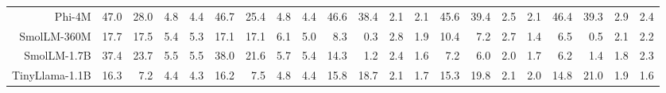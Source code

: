 \documentclass[letterpaper]{article}
\begin{document}
\begin{table}[t]
{\begin{tabular}{rrrrr|rrrr|rrrr|rrrr|rrrr}
Phi-4M & \cellcolor[HTML]{E4EDCC}47.0 & \cellcolor[HTML]{FEEDCC}28.0 & \cellcolor[HTML]{F8CECC}4.8 & \cellcolor[HTML]{F8CECC}4.4 & \cellcolor[HTML]{E3ECCC}46.7 & \cellcolor[HTML]{FEEBCC}25.4 & \cellcolor[HTML]{F9CFCC}4.8 & \cellcolor[HTML]{F8CFCC}4.4 & \cellcolor[HTML]{D3E9CC}46.6 & \cellcolor[HTML]{E4EDCC}38.4 & \cellcolor[HTML]{F9CFCC}2.1 & \cellcolor[HTML]{F8CFCC}2.1 & \cellcolor[HTML]{D4E9CC}45.6 & \cellcolor[HTML]{E1ECCC}39.4 & \cellcolor[HTML]{F8CECC}2.5 & \cellcolor[HTML]{F8CECC}2.1 & \cellcolor[HTML]{D3E9CC}46.4 & \cellcolor[HTML]{E2ECCC}39.3 & \cellcolor[HTML]{F9D0CC}2.9 & \cellcolor[HTML]{F9CFCC}2.4 \\
SmolLM-360M & \cellcolor[HTML]{FCDFCC}17.7 & \cellcolor[HTML]{FCDFCC}17.5 & \cellcolor[HTML]{F9CFCC}5.4 & \cellcolor[HTML]{F9CFCC}5.3 & \cellcolor[HTML]{FCE0CC}17.1 & \cellcolor[HTML]{FCE0CC}17.1 & \cellcolor[HTML]{F9D1CC}6.1 & \cellcolor[HTML]{F9CFCC}5.0 & \cellcolor[HTML]{FAD8CC}8.3 & \cellcolor[HTML]{F8CCCC}0.3 & \cellcolor[HTML]{F9D0CC}2.8 & \cellcolor[HTML]{F8CECC}1.9 & \cellcolor[HTML]{FBDBCC}10.4 & \cellcolor[HTML]{FAD6CC}7.2 & \cellcolor[HTML]{F8CFCC}2.7 & \cellcolor[HTML]{F8CDCC}1.4 & \cellcolor[HTML]{FAD5CC}6.5 & \cellcolor[HTML]{F8CCCC}0.5 & \cellcolor[HTML]{F8CECC}2.1 & \cellcolor[HTML]{F8CFCC}2.2 \\
SmolLM-1.7B & \cellcolor[HTML]{F5F0CC}37.4 & \cellcolor[HTML]{FDE7CC}23.7 & \cellcolor[HTML]{F9CFCC}5.5 & \cellcolor[HTML]{F9CFCC}5.5 & \cellcolor[HTML]{F2EFCC}38.0 & \cellcolor[HTML]{FDE6CC}21.6 & \cellcolor[HTML]{F9D0CC}5.7 & \cellcolor[HTML]{F9D0CC}5.4 & \cellcolor[HTML]{FCE1CC}14.3 & \cellcolor[HTML]{F8CDCC}1.2 & \cellcolor[HTML]{F9CFCC}2.4 & \cellcolor[HTML]{F8CECC}1.6 & \cellcolor[HTML]{FAD6CC}7.2 & \cellcolor[HTML]{F9D4CC}6.0 & \cellcolor[HTML]{F8CECC}2.0 & \cellcolor[HTML]{F8CDCC}1.7 & \cellcolor[HTML]{FAD5CC}6.2 & \cellcolor[HTML]{F8CDCC}1.4 & \cellcolor[HTML]{F8CECC}1.8 & \cellcolor[HTML]{F8CFCC}2.3 \\
TinyLlama-1.1B & \cellcolor[HTML]{FBDECC}16.3 & \cellcolor[HTML]{F9D2CC}7.2 & \cellcolor[HTML]{F8CECC}4.4 & \cellcolor[HTML]{F8CECC}4.3 & \cellcolor[HTML]{FBDECC}16.2 & \cellcolor[HTML]{F9D3CC}7.5 & \cellcolor[HTML]{F9CFCC}4.8 & \cellcolor[HTML]{F8CFCC}4.4 & \cellcolor[HTML]{FCE4CC}15.8 & \cellcolor[HTML]{FDE8CC}18.7 & \cellcolor[HTML]{F9CFCC}2.1 & \cellcolor[HTML]{F8CECC}1.7 & \cellcolor[HTML]{FCE2CC}15.3 & \cellcolor[HTML]{FDEACC}19.8 & \cellcolor[HTML]{F8CECC}2.1 & \cellcolor[HTML]{F8CECC}2.0 & \cellcolor[HTML]{FCE2CC}14.8 & \cellcolor[HTML]{FEEBCC}21.0 & \cellcolor[HTML]{F8CECC}1.9 & \cellcolor[HTML]{F8CECC}1.6 \\

\end{tabular}}
\end{table}
\end{document}
